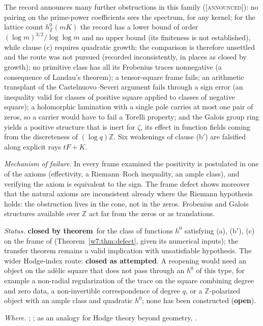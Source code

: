 \documentclass[11pt]{amsart}
\theoremstyle{definition}
\theoremstyle{remark}
\numberwithin{equation}{section}
\newcommand{\Z}{\mathbb{Z}}
\newcommand{\stag}[1]{\textsc{[#1]}}
\newcommand{\ANNOUNCED}{\stag{announced}}
\newcommand{\rtag}[1]{\textbf{\small\textsf{#1}}}
\newcommand{\closedT}{\rtag{closed by theorem}}
\newcommand{\closedA}{\rtag{closed as attempted}}
\newcommand{\openR}{\rtag{open}}
\newcommand{\entry}[1]{\par\smallskip\noindent\textit{#1.}\enspace}
\begin{document}
The record announces many further obstructions in this family (\ANNOUNCED): no pairing on the prime-power
coefficients sees the spectrum, for any kernel; for the lattice count $h^0_\Z(mK)$ the record has a lower bound of
order $(\log m)^{3/2}/\log\log m$ and no upper bound (its finiteness is not established), while clause (c)
requires quadratic growth; the comparison is therefore unsettled and the route was not pursued (recorded
inconsistently, in places as closed by growth); no primitive class has all its
Frobenius traces nonnegative (a consequence of Landau's theorem); a tensor-square frame fails; an arithmetic
transplant of the Castelnuovo--Severi argument fails through a sign error (an inequality valid for classes of
positive square applied to classes of negative square); a holomorphic lamination with a single pole carries at
most one pair of zeros, so a carrier would have to fail a Torelli property; and the Galois group ring yields a
positive structure that is inert for $\zeta$, its effect in function fields coming from the discreteness of
$(\log q)\Z$. Six weakenings of clause (b$'$) are falsified along explicit rays $tF+K$.

\entry{Mechanism of failure} In every frame examined the positivity is postulated in one of the axioms
(effectivity, a Riemann--Roch inequality, an ample class), and verifying the axiom is equivalent to the sign.
The frame defect shows moreover that the natural axioms are inconsistent already where the Riemann hypothesis
holds: the obstruction lives in the cone, not in the zeros. Frobenius and Galois structures available over $\Z$
act far from the zeros or as translations.

\entry{Status} \closedT\ for the class of functions $h^0$ satisfying (a), (b$'$), (c) on the frame of
\cite{P47} (Theorem~\ref{w7:thm:defect}, given its numerical inputs); the transfer theorem remains a valid
implication with unsatisfiable hypothesis. The wider Hodge-index route: \closedA. A reopening would need an
object on the ad\`elic square that does not pass through an $h^0$ of this type, for example a non-radial
regularization of the trace on the square combining degree and zero data, a non-invertible correspondence of
degree $q$, or a $\Z$-polarized object with an ample class and quadratic $h^0$; none has been constructed
(\openR).

\entry{Where} \cite{P17,P28,P42,P43,P44,P45,P47}; \cite{Weil48,Grothendieck1958,Grothendieck1969,Lang1966}; as an analogy for Hodge
theory beyond geometry, \cite{AdiprasitoHuhKatz2018}.
\end{document}
